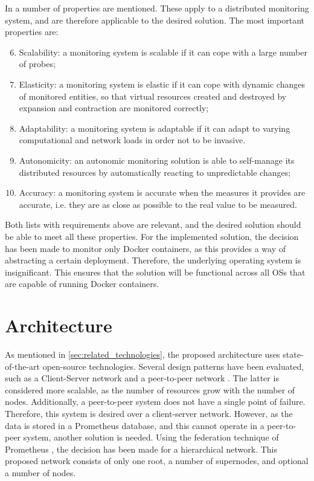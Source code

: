 \noindent
In \cite{aceto2013cloud} a number of properties are mentioned. These apply to a distributed monitoring system, and are therefore applicable to the desired solution. The most important properties are:
\begin{enumerate}
    \setcounter{enumi}{5}
    \item Scalability: a monitoring system is scalable if it can cope with a large number of probes;
    \item Elasticity: a monitoring system is elastic if it can cope with dynamic changes of monitored entities, so that virtual resources created and destroyed by expansion and contraction are monitored correctly;
    \item Adaptability: a monitoring system is adaptable if it can adapt to varying computational and network loads in order not to be invasive.
    \item Autonomicity: an autonomic monitoring solution is able to self-manage its distributed resources by automatically reacting to unpredictable changes;
    \item Accuracy: a monitoring system is accurate when the measures it provides are accurate, i.e. they are as close as possible to the real value to be measured.
\end{enumerate}

\noindent
Both lists with requirements above are relevant, and the desired solution should be able to meet all these properties. For the implemented solution, the decision has been made to monitor only Docker containers, as this provides a way of abstracting a certain deployment. Therefore, the underlying operating system is insignificant. This ensures that the solution will be functional across all OSs that are capable of running Docker containers. 

\section{Architecture} \label{sec:architecture}
As mentioned in \autoref{sec:related_technologies}, the proposed architecture uses state-of-the-art open-source technologies. Several design patterns have been evaluated, such as a Client-Server network and a peer-to-peer network \cite{coulouris2005distributed}. The latter is considered more scalable, as the number of resources grow with the number of nodes. Additionally, a peer-to-peer system does not have a single point of failure. Therefore, this system is desired over a client-server network. However, as the data is stored in a Prometheus database, and this cannot operate in a peer-to-peer system, another solution is needed. Using the federation technique of Prometheus \cite{prometheus_federation}, the decision has been made for a hierarchical network. This proposed network consists of only one root, a number of supernodes, and optional a number of nodes.\\

